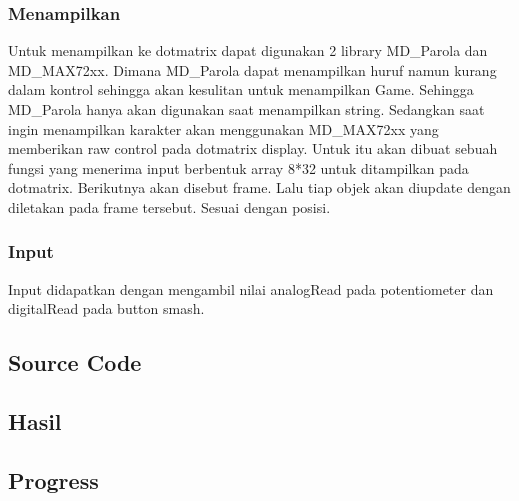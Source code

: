 \documentclass[a4paper,12pt]{article}
\begin{document}
\subsubsection{Menampilkan}
Untuk menampilkan ke dotmatrix dapat digunakan 2 library MD\_Parola dan MD\_MAX72xx. Dimana MD\_Parola dapat
menampilkan huruf namun kurang dalam kontrol sehingga akan kesulitan untuk menampilkan Game. Sehingga MD\_Parola hanya akan digunakan
saat menampilkan string. Sedangkan saat ingin menampilkan karakter akan menggunakan MD\_MAX72xx yang memberikan raw control pada
dotmatrix display. Untuk itu akan dibuat sebuah fungsi yang menerima input berbentuk array 8*32 untuk ditampilkan pada dotmatrix. Berikutnya
akan disebut frame. Lalu tiap objek akan diupdate dengan diletakan pada frame tersebut. Sesuai dengan posisi.

\subsubsection{Input}
Input didapatkan dengan mengambil nilai analogRead pada potentiometer dan digitalRead pada button smash.
\subsection{Source Code}











\subsection{Hasil}
\subsection{Progress}
\end{document}
